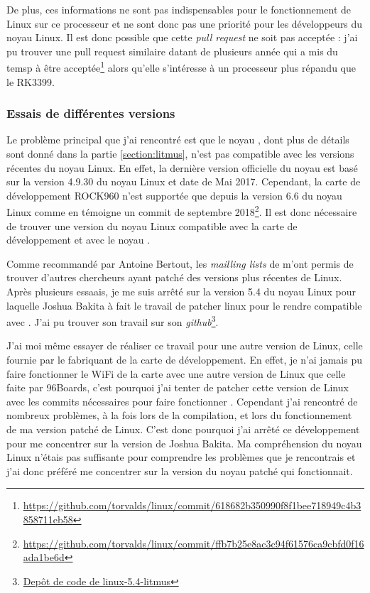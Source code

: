 De plus, ces informations ne sont pas indispensables pour le fonctionnement de Linux sur ce processeur et ne sont donc pas une priorité pour les développeurs du noyau Linux. Il est donc possible que cette \textit{pull request} ne soit pas acceptée : j'ai pu trouver une pull request similaire datant de plusieurs année qui a mis du temsp à être acceptée\footnote{\href{https://github.com/torvalds/linux/commit/618682b350990f8f1bee718949c4b3858711eb58}{https://github.com/torvalds/linux/commit/618682b350990f8f1bee718949c4b3858711eb58}} alors qu'elle s'intéresse à un processeur plus répandu que le RK3399.


\subsubsection{Essais de différentes versions}

Le problème principal que j'ai rencontré est que le noyau \litmus, dont plus de détails sont donné dans la partie \ref{section:litmus}, n'est pas compatible avec les versions récentes du noyau Linux. En effet, la dernière version officielle du noyau \litmus est basé sur la version 4.9.30 du noyau Linux et date de Mai 2017. Cependant, la carte de développement ROCK960 n'est supportée que depuis la version 6.6 du noyau Linux comme en témoigne un commit de septembre 2018\footnote{\href{https://github.com/torvalds/linux/commit/ffb7b25e8ac3c94f61576ca9cbfd0f16ada1be6d}{https://github.com/torvalds/linux/commit/ffb7b25e8ac3c94f61576ca9cbfd0f16ada1be6d}}. Il est donc nécessaire de trouver une version du noyau Linux compatible avec la carte de développement et avec le noyau \litmus.

Comme recommandé par Antoine Bertout, les \textit{mailling lists} de \litmus m'ont permis de trouver d'autres chercheurs ayant patché des versions plus récentes de Linux. Après plusieurs essaais, je me suis arrêté sur la version 5.4 du noyau Linux pour laquelle Joshua Bakita à fait le travail de patcher linux pour le rendre compatible avec \litmus. J'ai pu trouver son travail sur son \textit{github}\footnote{\href{https://github.com/JoshuaJB/litmus-rt/tree/linux-5.4-litmus}{Depôt de code de linux-5.4-litmus}}. 

J'ai moi même essayer de réaliser ce travail pour une autre version de Linux, celle fournie par le fabriquant de la carte de développement. En effet, je n'ai jamais pu faire fonctionner le WiFi de la carte avec une autre version de Linux que celle faite par 96Boards, c'est pourquoi j'ai tenter de patcher cette version de Linux avec les commits nécessaires pour faire fonctionner \litmus. Cependant j'ai rencontré de nombreux problèmes, à la fois lors de la compilation, et lors du fonctionnement de ma version patché de Linux. C'est donc pourquoi j'ai arrêté ce développement pour me concentrer sur la version de Joshua Bakita. Ma compréhension du noyau Linux n'étais pas suffisante pour comprendre les problèmes que je rencontrais et j'ai donc préféré me concentrer sur la version du noyau patché qui fonctionnait.

